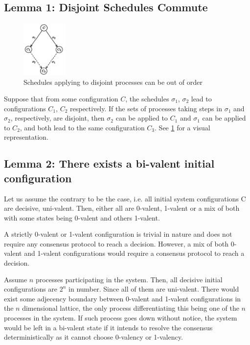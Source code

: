 \subsection{Lemma 1: Disjoint Schedules Commute}
\begin{figure}
    \centering
    \includegraphics[width=0.20\textwidth]{general-problems/assets/flp-impossibility-lemma1.png}
    \caption{Schedules applying to disjoint processes can be out of order}
    \label{fig:flp-impossibility-lemma1}
\end{figure}
Suppose that from some configuration $C$, the schedules $\sigma_1$, $\sigma_2$ lead to configurations $C_1$, $C_2$ respectively. If the sets of processes taking steps in $\sigma_1$ and $\sigma_2$, respectively, are disjoint, then $\sigma_2$ can be applied to $C_1$ and $\sigma_1$ can be applied to $C_2$, and both lead to the same configuration $C_3$. See \ref{fig:flp-impossibility-lemma1} for a visual representation.

\subsection{Lemma 2: There exists a bi-valent initial configuration}

Let us assume the contrary to be the case, i.e. all initial system configurations C are decisive, uni-valent. Then, either all are 0-valent, 1-valent or a mix of both with some states being 0-valent and others 1-valent.

A strictly 0-valent or 1-valent configuration is trivial in nature and does not require any consensus protocol to reach a decision. However, a mix of both 0-valent and 1-valent configurations would require a consensus protocol to reach a decision.

Assume $n$ processes participating in the system. Then, all decisive initial configurations are $2^n$ in number. Since all of them are uni-valent. There would exist some adjecency boundary between 0-valent and 1-valent configurations in the $n$ dimensional lattice, the only process differentiating this being one of the $n$ processes in the system. If such process goes down without notice, the system would be left in a bi-valent state if it intends to resolve the consensus deterministically as it cannot choose 0-valency or 1-valency.

